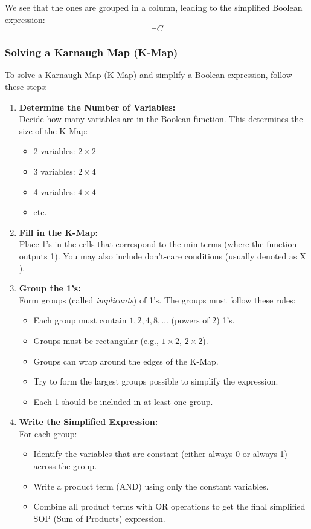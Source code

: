 We see that the ones are grouped in a column, leading to the simplified Boolean expression:
\[
	\neg C
\]

\subsubsection{Solving a Karnaugh Map (K-Map)}

To solve a Karnaugh Map (K-Map) and simplify a Boolean expression, follow these steps:

\begin{enumerate}
	\item \textbf{Determine the Number of Variables:} \\
	      Decide how many variables are in the Boolean function. This determines the size of the K-Map:
	      \begin{itemize}[label=\(-\)]
		      \item 2 variables: \(2 \times 2\)
		      \item 3 variables: \(2 \times 4\)
		      \item 4 variables: \(4 \times 4\)
		      \item etc.
	      \end{itemize}

	\item \textbf{Fill in the K-Map:} \\
	      Place 1's in the cells that correspond to the min-terms (where the function outputs 1). You may also include don't-care conditions (usually denoted as \(\)X\(\)).

	\item \textbf{Group the 1's:} \\
	      Form groups (called \emph{implicants}) of 1's. The groups must follow these rules:
	      \begin{itemize}[label=\(-\)]
		      \item Each group must contain \(1, 2, 4, 8, \ldots\) (powers of 2) 1's.
		      \item Groups must be rectangular (e.g., \(1 \times 2\), \(2 \times 2\)).
		      \item Groups can wrap around the edges of the K-Map.
		      \item Try to form the largest groups possible to simplify the expression.
		      \item Each 1 should be included in at least one group.
	      \end{itemize}

	\item \textbf{Write the Simplified Expression:} \\
	      For each group:
	      \begin{itemize}[label=\(-\)]
		      \item Identify the variables that are constant (either always 0 or always 1) across the group.
		      \item Write a product term (AND) using only the constant variables.
		      \item Combine all product terms with OR operations to get the final simplified SOP (Sum of Products) expression.
	      \end{itemize}
\end{enumerate}

